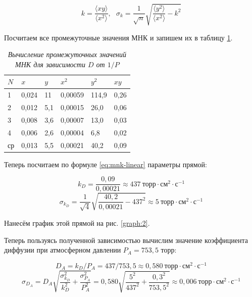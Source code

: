 \documentclass[a4paper,12pt]{article}
\begin{document}
\begin{equation}\label{eq:mnk-linear}
    k = \frac{\langle x y \rangle}{\langle x^2 \rangle}, \ \ \ \sigma_k = \frac{1}{\sqrt{n}} \sqrt{\frac{\langle y^2 \rangle}{\langle x^2 \rangle} - k^2}
\end{equation}

Посчитаем все промежуточные значения МНК и запишем их в таблицу \ref{table:mnk-2}.

\begin{table}[!ht]
    \centering
    \begin{tabular}{|l|l|l|l|l|l|}
    \hline
        $N$ & $x$ & $y$ & $x^2$ & $y^2$ & $xy$ \\ \hline
        1 & 0,024 & 11 & 0,00059 & 114,9 & 0,26 \\ \hline
        2 & 0,012 & 5,1 & 0,00015 & 26,0 & 0,06 \\ \hline
        3 & 0,008 & 3,6 & 0,00007 & 13,0 & 0,03 \\ \hline
        4 & 0,006 & 2,6 & 0,00004 & 6,8 & 0,02 \\ \hline
        ср & 0,013 & 5,5 & 0,00021 & 40,2 & 0,09 \\ \hline
    \end{tabular}\caption{\textit{Вычисление промежуточных значений МНК для зависимости $D$ от $1/P$}}\label{table:mnk-2}
\end{table}

Теперь посчитаем по формуле \eqref{eq:mnk-linear} параметры прямой:

\begin{equation*}
    k_D = \frac{0,09}{0,00021} \approx 437 \ \text{торр} \cdot \text{см}^2 \cdot \text{с}^{-1}
\end{equation*}
\begin{equation*}
    \sigma_{k_D} = \frac{1}{\sqrt{4}} \sqrt{\frac{40,2}{0,00021} - 437^2} \approx 5 \ \text{торр} \cdot \text{см}^2 \cdot \text{с}^{-1}
\end{equation*}

Нанесём график этой прямой на рис. \ref{graph:2}.

Теперь пользуясь полученной зависимостью вычислим значение коэффициента диффузии при атмосферном давлении $P_A = 753,5$ торр:

\begin{equation*}
    D_A = k_D / P_A = 437 / 753,5 \approx 0,580 \ \text{торр} \cdot \text{см}^2 \cdot \text{с}^{-1}
\end{equation*}
\begin{equation*}
    \sigma_{D_A} = D_A \sqrt{
    \frac{\sigma_{k_D}^2}{k_D^2} + \frac{\sigma_{P_A}^2}{P_A^2}} = 0,580 \sqrt{
    \frac{5^2}{437^2} + \frac{{0,3}^2}{{753,5}^2}
    } \approx 0,006 \ \text{торр} \cdot \text{см}^2 \cdot \text{с}^{-1}
\end{equation*}
\end{document}
